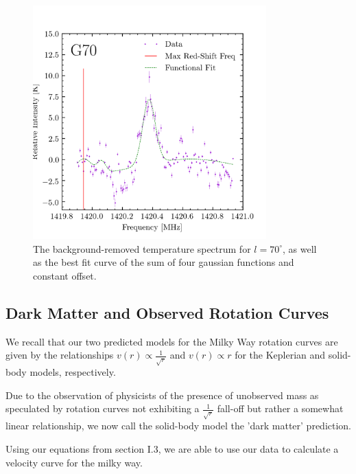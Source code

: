 \documentclass[aps,twocolumn,secnumarabic,balancelastpage,amsmath,amssymb,nofootinbib, floatfix]{revtex4-2}
\begin{document}
	\begin{figure}[h]
		\centering
		\includegraphics[width=9cm]{spec70_gauss_fit.png}
		\caption{The background-removed temperature spectrum for $l=70^{\circ}$, as well as the best fit curve of the sum of four gaussian functions and constant offset.}
		\label{fig:gausspec70}
	\end{figure}
	
	\subsection{Dark Matter and Observed Rotation Curves}
	We recall that our two predicted models for the Milky Way rotation curves are given by the relationships $v(r)\propto \frac{1}{\sqrt{r}}$ and $v(r)\propto r$ for the Keplerian and solid-body models, respectively. 
	
	Due to the observation of physicists of the presence of unobserved mass as speculated by rotation curves not exhibiting a $\frac{1}{\sqrt{r}}$ fall-off but rather a somewhat linear relationship, we now call the solid-body model the 'dark matter' prediction.
	
	Using our equations from section I.3, we are able to use our data to calculate a velocity curve for the milky way.
	
\end{document}
